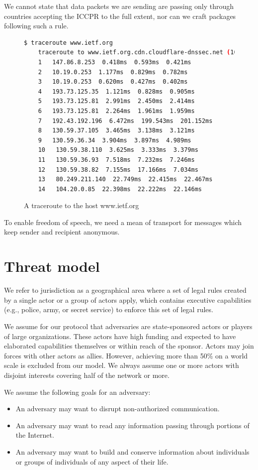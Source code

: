 We cannot state that data packets we are sending are passing only through countries accepting the ICCPR to the full extent, nor can we craft packages following such a rule.

\begin{figure}[H]
	\begin{lstlisting}[language=bash,breaklines=true,basicstyle=\tiny]
	$ traceroute www.ietf.org
	traceroute to www.ietf.org.cdn.cloudflare-dnssec.net (104.20.0.85), 64 hops max
	1   147.86.8.253  0.418ms  0.593ms  0.421ms
	2   10.19.0.253  1.177ms  0.829ms  0.782ms
	3   10.19.0.253  0.620ms  0.427ms  0.402ms
	4   193.73.125.35  1.121ms  0.828ms  0.905ms
	5   193.73.125.81  2.991ms  2.450ms  2.414ms
	6   193.73.125.81  2.264ms  1.961ms  1.959ms
	7   192.43.192.196  6.472ms  199.543ms  201.152ms
	8   130.59.37.105  3.465ms  3.138ms  3.121ms
	9   130.59.36.34  3.904ms  3.897ms  4.989ms
	10   130.59.38.110  3.625ms  3.333ms  3.379ms
	11   130.59.36.93  7.518ms  7.232ms  7.246ms
	12   130.59.38.82  7.155ms  17.166ms  7.034ms
	13   80.249.211.140  22.749ms  22.415ms  22.467ms
	14   104.20.0.85  22.398ms  22.222ms  22.146ms
	\end{lstlisting}
	\caption{A traceroute to the host www.ietf.org}
\end{figure}

To enable freedom of speech, we need a mean of transport for messages which keep sender and recipient anonymous.

\section{Threat model\label{sec:adversary}}
We refer to jurisdiction as a geographical area where a set of legal rules created by a single actor or a group of actors apply, which contains executive capabilities (e.g., police, army, or secret service) to enforce this set of legal rules.

We assume for our protocol that adversaries are state-sponsored actors or players of large organizations. These actors have high funding and expected to have elaborated capabilities themselves or within reach of the sponsor. Actors may join forces with other actors as allies. However, achieving more than 50\% on a world scale is excluded from our model. We always assume one or more actors with disjoint interests covering half of the network or more. 

We assume the following goals for an adversary:
\begin{itemize}
	\item An adversary may want to disrupt non-authorized communication.
	\item An adversary may want to read any information passing through portions of the Internet.
	\item An adversary may want to build and conserve information about individuals or groups of individuals of any aspect of their life. 
\end{itemize}


